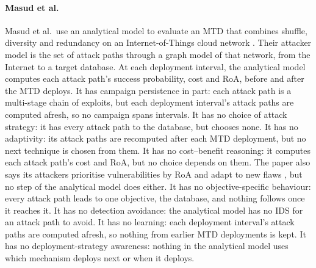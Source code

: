 \documentclass{cshonours}
\begin{document}
\paragraph{Masud et al.} Masud et al.\ use an analytical model to evaluate
an MTD that combines shuffle, diversity and redundancy on an
Internet-of-Things cloud network \citep{masud2025}. Their attacker model is
the set of attack paths through a graph model of that network, from the
Internet to a target database. At each deployment interval, the analytical
model computes each attack path's success probability, cost and RoA,
before and after the MTD deploys. It has campaign persistence in part: each attack path is a multi-stage chain of exploits, but each deployment interval's
attack paths are computed afresh, so no campaign spans intervals. It has no choice of attack strategy: it has every attack path to the database, but chooses
none. It has no adaptivity: its attack paths are recomputed after
each MTD deployment, but no next technique is chosen from them. It has no cost--benefit reasoning: it computes each attack path's cost
and RoA, but no choice depends on them. The paper also says its attackers
prioritise vulnerabilities by RoA and adapt to new flaws
\citep[p.~7]{masud2025}, but no step of the analytical model does either. It has no objective-specific behaviour: every attack path leads to one
objective, the database, and nothing follows once it reaches it. It has no detection avoidance: the analytical model has no IDS for an attack path to avoid. It has no learning:
each deployment interval's attack paths are computed afresh, so nothing
from earlier MTD deployments is kept. It has no deployment-strategy awareness: nothing in the analytical model uses which mechanism deploys next or when it
deploys.
\end{document}
